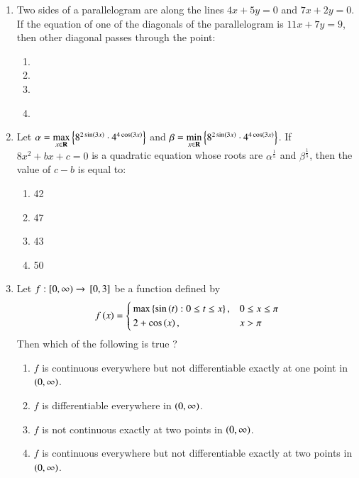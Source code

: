 \documentclass[journal]{IEEEtran}
\begin{document}
\begin{enumerate}
\begin{enumerate}
\end{enumerate}
\item Two sides of a parallelogram are along the lines $4x + 5y = 0$ and $7x+ 2y = 0$. If the equation of one of the diagonals of the parallelogram is $11x + 7y = 9$, then other diagonal passes through the point:
\begin{enumerate}
    \item {}
    \item {}
    \item {}
    \item {}\\
\end{enumerate}
\item Let $\alpha = \max\limits_{x\in\textbf{R}}\left\{8^{2\sin\left(3x\right)} \cdot 4^{4\cos\left(3x\right)}\right\}$ and $\beta = \min\limits_{x\in\textbf{R}}\left\{8^{2\sin\left(3x\right)} \cdot 4^{4\cos\left(3x\right)}\right\}$. If $8x^2 + bx + c = 0$ is a quadratic equation whose roots are $\alpha^{\frac{1}{5}}$ and $\beta^{\frac{1}{5}}$, then the value of $c - b$ is equal to:
\begin{enumerate}
    \item 42
    \item 47
    \item 43
    \item 50\\
\end{enumerate}
\item Let $f: [0, \infty) \rightarrow {}\left[0, 3\right]$ be a function defined by 
\begin{align*}
f\left(x\right) =
    \begin{cases}
    \max\left\{\sin\left(t\right):0 \leq t \leq x \right\}, & 0 \leq x \leq \pi \\
    2 + \cos\left(x\right), & x > \pi
    \end{cases}
\end{align*}
Then which of the following is true ?
\begin{enumerate}
    \item $f$ is continuous everywhere but not differentiable exactly at one point in $\left(0, \infty\right)$.
    \item $f$ is differentiable everywhere in $\left(0, \infty\right)$.
    \item $f$ is not continuous exactly at two points in $\left(0, \infty\right)$.
    \item $f$ is continuous everywhere but not differentiable exactly at two points in $\left(0, \infty\right)$.\\

\end{enumerate}
\end{enumerate}
\end{document}
